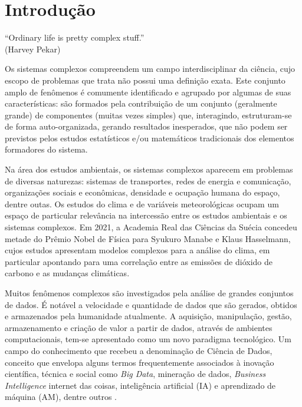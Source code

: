 \chapter{Introdução}
\label{cap:introducao}


\begin{flushright}
``Ordinary life is pretty complex stuff.''\\
(Harvey Pekar)
\end{flushright}

Os sistemas complexos compreendem um campo interdisciplinar da ciência, cujo escopo de problemas que trata não possui uma definição exata. Este conjunto amplo de fenômenos é comumente identificado e agrupado por algumas de suas características: são formados pela contribuição de um conjunto (geralmente grande) de componentes (muitas vezes simples) que, interagindo, estruturam-se de forma auto-organizada, gerando resultados inesperados, que não podem ser previstos pelos estudos estatísticos e/ou matemáticos tradicionais dos elementos formadores do sistema.

Na área dos estudos ambientais, os sistemas complexos aparecem em problemas de diversas naturezas: sistemas de transportes, redes de energia e comunicação, organizações sociais e econômicas, densidade e ocupação humana do espaço, dentre outas. Os estudos do clima e de variáveis meteorológicas ocupam um espaço de particular relevância na intercessão entre os estudos ambientais e os sistemas complexos. Em 2021, a Academia Real das Ciências da Suécia concedeu metade do Prêmio Nobel de Física para Syukuro Manabe e Klaus Hasselmann, cujos estudos apresentam modelos complexos para a análise do clima, em particular apontando para uma correlação entre as emissões de dióxido de carbono e as mudanças climáticas.

Muitos fenômenos complexos são investigados pela análise de grandes conjuntos de dados. É notável a velocidade e quantidade de dados que são gerados, obtidos e armazenados pela humanidade atualmente. A aquisição, manipulação, gestão, armazenamento e criação de valor a partir de dados, através de ambientes computacionais, tem-se apresentado como um novo paradigma tecnológico. Um campo do conhecimento que recebeu a denominação de Ciência de Dados, conceito que envelopa alguns termos frequentemente associados à inovação científica, técnica e social como \emph{Big Data}, mineração de dados, \emph{Business Intelligence} internet das coisas, inteligência artificial (IA) e aprendizado de máquina (AM), dentre outros \cite[p. 12-13]{EMCdata2015}.

